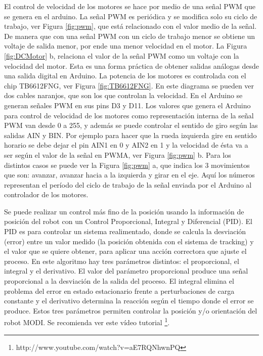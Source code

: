 El control de velocidad de los motores se hace por medio de una señal PWM que se genera en el arduino. La señal PWM es periódica y se modifica solo su ciclo de trabajo, ver Figura \ref{fig:pwm}, que está relacionado con el valor medio de la señal. De manera que con una señal PWM con un ciclo de trabajo menor se obtiene un voltaje de salida menor, por ende una menor velocidad en el motor.  La Figura \ref{fig:DCMotor} b, relaciona el valor de la señal PWM como un voltaje con la velocidad del motor. Esta es una forma práctica de obtener salidas análogas desde una salida digital en Arduino. 
La potencia de los motores es controlada con el chip TB6612FNG, ver Figura \ref{fig:TB6612FNG}. En este diagrama se pueden ver dos cables naranjos, que son los que controlan la velocidad. En el Arduino se generan señales PWM en sus pins D3 y D11. Los valores que genera el Arduino para control de velocidad de los motores como representación interna de la señal PWM van desde 0 a 255, y además se puede controlar el sentido de giro según las salidas AIN y BIN. Por ejemplo para hacer que la rueda izquierda gire en sentido horario se debe dejar el pin AIN1 en 0 y AIN2 en 1 y la velocidad de ésta va a ser según el valor de la señal en PWMA, ver Figura \ref{fig:pwm} b. Para los distintos casos se puede ver la Figura \ref{fig:pwm} a, que indica los 3 movimientos que son: avanzar, avanzar hacia a la izquierda y girar en el eje. Aquí los números representan el período del ciclo de trabajo de la señal enviada por el Arduino al controlador de los motores. 

Se puede realizar un control más fino de la posición usando la información de posición del robot con un Control Proporcional, Integral y Diferencial (PID). El PID es para controlar un sistema realimentado, donde se calcula la desviación (error) entre un valor medido (la posición obtenida con el sistema de tracking) y el valor que se quiere obtener, para aplicar una acción correctora que ajuste el proceso. En este algoritmo hay tres parámetros distintos: el proporcional, el integral y el derivativo. El valor del parámetro proporcional produce una señal proporcional a la desviación de la salida del proceso. El integral elimina el problema del error en estado estacionario frente a perturbaciones de carga constante y el derivativo determina la reacción según el tiempo donde el error se produce. Estos tres parámetros permiten controlar la posición y/o orientación del robot MODI. Se recomienda ver este vídeo tutorial \footnote{http://www.youtube.com/watch?v=aE7RQNhwnPQ}. 

